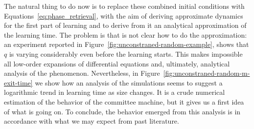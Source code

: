 The natural thing to do now is to replace these combined initial conditions with Equations~\eqref{eq:phase_retrieval},
with the aim of deriving approximate dynamics for the first part of learning
and to derive from it an analytical approximation of the learning time.
The problem is that is not clear how to do the approximation: an experiment reported in Figure~\ref{fig:unconstraned-random-example},
shows that \(q\) is varying considerably even before the learning starts.
This makes impossible all low-order expansions of differential equations and,
ultimately, analytical analysis of the phenomenon.
Nevertheless, in Figure~\ref{fig:unconstraned-random-m-exit-time} we show how an analysis of the simulations seems to suggest
a logarithmic trend in learning time as size changes. It is a crude numerical estimation of the behavior of the committee machine,
but it gives us a first idea of what is going on. To conclude, the behavior emerged from this analysis
is in accordance with what we may expect from past literature\cite{arous2021online}.
